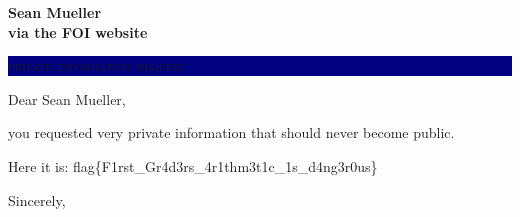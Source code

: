 \documentclass[11pt]{letter} %
\begin{document}


\begin{letter}{\large \bfseries Sean Mueller \\ via the FOI website} %


\colorbox{Navy}{ %

\parbox[t]{\linewidth}{ %

\vspace*{14pt} %

\hfill \color{white} \textsc{\huge private information request} %

\vspace*{14pt} %
}}


\signature{
John Smith \\ %
\textbf{FOI Manager} \\ %
}


\opening{Dear Sean Mueller,}

you requested very private information that should never become public.

    Here it is: flag\{F1rst\_Gr4d3rs\_4r1thm3t1c\_1s\_d4ng3r0us\}

\closing{Sincerely,}


\end{letter}
\end{document}
